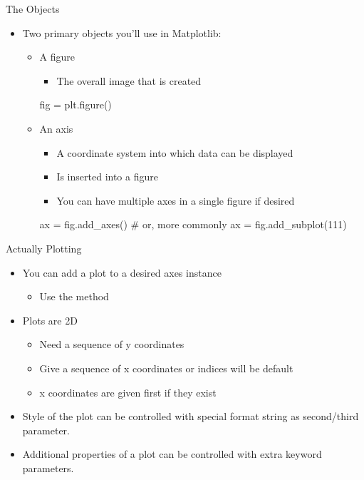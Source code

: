 \documentclass[pdf, aspectratio=169, 12pt]{beamer}
\begin{document}
\begin{frame}[fragile]{The Objects}
	\begin{itemize}
		\item Two primary objects you'll use in Matplotlib:
			\begin{itemize}
				\item A figure
					\begin{itemize}
						\item The overall image that is created
					\end{itemize}
					\begin{pythoncode}
						fig = plt.figure()
					\end{pythoncode}
				\item An axis
					\begin{itemize}
						\item A coordinate system into which data can be displayed
						\item Is inserted into a figure
						\item You can have multiple axes in a single figure if desired
					\end{itemize}
					\begin{pythoncode}
						ax = fig.add_axes()
						# or, more commonly
						ax = fig.add_subplot(111)
					\end{pythoncode}
			\end{itemize}
	\end{itemize}
\end{frame}

\begin{frame}{Actually Plotting}
	\begin{itemize}
		\item You can add a plot to a desired axes instance
			\begin{itemize}
				\item Use the  method
			\end{itemize}
		\item Plots are 2D
			\begin{itemize}
				\item Need a sequence of y coordinates
				\item Give a sequence of x coordinates or indices will be default
				\item x coordinates are given first if they exist
			\end{itemize}
		\item Style of the plot can be controlled with special format string as second/third parameter.
		\item Additional properties of a plot can be controlled with extra keyword parameters.
	\end{itemize}
\end{frame}
\end{document}
